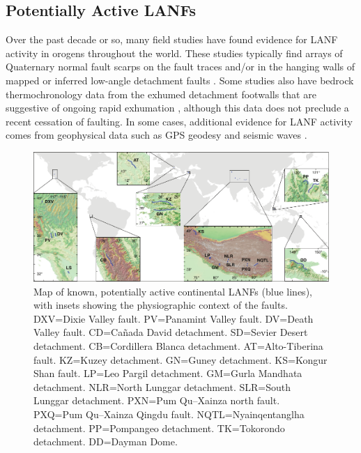 \documentclass[draft,grl]{AGUTeX}
\begin{document}
\begin{article}
\section{Potentially Active LANFs}

Over the past decade or so, many field studies have found evidence for LANF
activity in orogens throughout the world. These studies typically find arrays
of Quaternary normal fault scarps on the fault traces and/or in the hanging
walls of mapped or inferred low-angle detachment faults \citep [e.g.,]
[]{axen1999baja}. Some studies also have bedrock thermochronology data from the
exhumed detachment footwalls that are suggestive of ongoing rapid exhumation
\citep [e.g.,][]{sundell2013lunggar}, although this data does not preclude
a recent cessation of faulting. In some cases, additional evidence for LANF
activity comes from geophysical data such as GPS geodesy \citep [e.g.,]
[]{hreinsdottir2009altotib} and seismic waves \citep
[e.g.,][]{doser1987ancash}.

\begin{figure}%
\noindent\includegraphics[width=40pc]{./figures/active_lanfs_map_insets.pdf}
\caption{Map of known, potentially active continental LANFs (blue lines), with
insets showing the physiographic context of the faults.  DXV=Dixie Valley
fault.  PV=Panamint Valley fault.  DV=Death Valley fault.  CD=Ca\~nada David
detachment.  SD=Sevier Desert detachment.  CB=Cordillera Blanca detachment.  
AT=Alto-Tiberina fault.  KZ=Kuzey detachment.  GN=Guney detachment.  
KS=Kongur Shan fault.  LP=Leo Pargil detachment.  GM=Gurla Mandhata 
detachment. NLR=North Lunggar detachment.  SLR=South Lunggar detachment.  
PXN=Pum Qu--Xainza north fault.  PXQ=Pum Qu--Xainza Qingdu fault. 
NQTL=Nyainqentanglha detachment.  PP=Pompangeo detachment.  
TK=Tokorondo detachment.  DD=Dayman Dome.}
\label{fig:lanf_map}
\end{figure}


\end{article}
\end{document}

